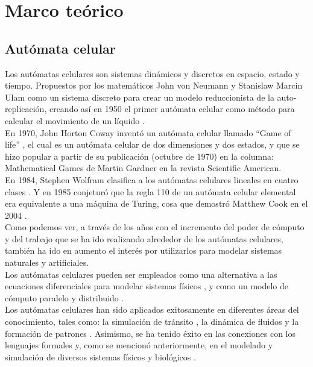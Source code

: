 \chapter{Marco teórico}

\section{Autómata celular}
Los autómatas celulares son sistemas dinámicos y discretos en espacio, estado y tiempo. Propuestos por los matemáticos John von Neumann y Stanislaw Marcin Ulam como un sistema discreto para crear un modelo reduccionista de la auto-replicación, creando así en 1950 el primer autómata celular como método para calcular el movimiento de un líquido \citep{biaynicki2012}. 
\\

En 1970, John Horton Coway inventó un autómata celular llamado “Game of life” \citep{gardner1970mathematical}, el cual es un autómata celular de dos dimensiones y dos estados, y que se hizo popular a partir de su publicación (octubre de 1970) en la columna: Mathematical Games de Martin Gardner en la revista Scientific American.
\\

En 1984, Stephen Wolfram clasifica a los autómatas celulares lineales en cuatro clases \citep{WOLFRAM19841}. Y en 1985 conjeturó que la regla 110 de un autómata celular elemental era equivalente a una máquina de Turing, cosa que demostró Matthew Cook en el 2004 \citep{cook2004universality}.
\\

Como podemos ver, a través de los años con el incremento del poder de cómputo y del trabajo que se ha ido realizando alrededor de los autómatas celulares, también ha ido en aumento el interés por utilizarlos para modelar sistemas naturales y artificiales.
\\

Los autómatas celulares pueden ser empleados como una alternativa a las ecuaciones diferenciales para modelar sistemas físicos \citep{toffoli1984cellular}, y como un modelo de cómputo paralelo y distribuido \citep{hillis1984connection}.
\\

Los autómatas celulares han sido aplicados exitosamente en diferentes áreas del conocimiento, tales como: la simulación de tránsito \citep{nagel1992cellular,simon1998simplified}, la dinámica de fluidos  \citep{margolus1986cellular} y la formación de patrones \citep{tamayo1987cellular,boerlijstk}. Asimismo, se ha tenido éxito en las conexiones con los lenguajes formales \citep{nordahl1989formal,culik1990computation} y, como se mencionó anteriormente, en el modelado y simulación de diversos sistemas físicos \citep{vichniac1984simulating,manneville2012cellular} y biológicos \citep{ermentrout1993cellular}.
\\

